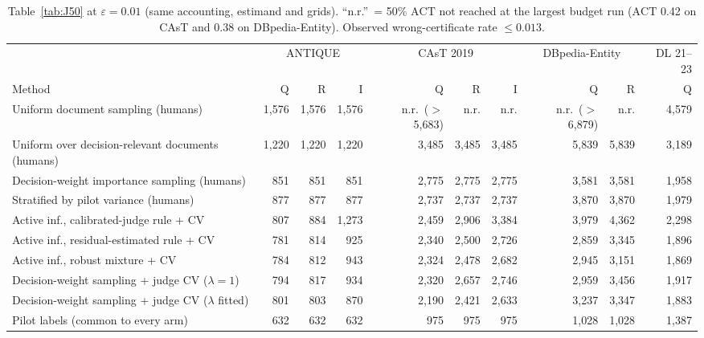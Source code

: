 \documentclass{article}
\newcommand{\eps}{\varepsilon}
\newcommand{\ACT}{\mathrm{ACT}}
\begin{document}
\begin{table}[htbp]\centering\scriptsize\setlength{\tabcolsep}{3pt}
\caption{Table~\ref{tab:J50} at $\eps=0.01$ (same accounting, estimand and grids). ``n.r.''\ = 50\% $\ACT$ not reached at the largest budget run ($\ACT$ 0.42 on CAsT and 0.38 on DBpedia-Entity). Observed wrong-certificate rate $\le0.013$.}\label{tab:J50b}
\begin{tabular}{l rrr rrr rr r}\toprule
 & \multicolumn{3}{c}{ANTIQUE} & \multicolumn{3}{c}{CAsT 2019} & \multicolumn{2}{c}{DBpedia-Entity} & DL 21--23\\
Method & Q & R & I & Q & R & I & Q & R & Q\\\midrule
Uniform document sampling (humans) & 1,576 & 1,576 & 1,576 & n.r.\ ($>$5,683) & n.r. & n.r. & n.r.\ ($>$6,879) & n.r. & 4,579\\
Uniform over decision-relevant documents (humans) & 1,220 & 1,220 & 1,220 & 3,485 & 3,485 & 3,485 & 5,839 & 5,839 & 3,189\\
Decision-weight importance sampling (humans) & 851 & 851 & 851 & 2,775 & 2,775 & 2,775 & 3,581 & 3,581 & 1,958\\
Stratified by pilot variance (humans) & 877 & 877 & 877 & 2,737 & 2,737 & 2,737 & 3,870 & 3,870 & 1,979\\
Active inf., calibrated-judge rule + CV & 807 & 884 & 1,273 & 2,459 & 2,906 & 3,384 & 3,979 & 4,362 & 2,298\\
Active inf., residual-estimated rule + CV & 781 & 814 & 925 & 2,340 & 2,500 & 2,726 & 2,859 & 3,345 & 1,896\\
Active inf., robust mixture + CV & 784 & 812 & 943 & 2,324 & 2,478 & 2,682 & 2,945 & 3,151 & 1,869\\
Decision-weight sampling + judge CV ($\lambda=1$) & 794 & 817 & 934 & 2,320 & 2,657 & 2,746 & 2,959 & 3,456 & 1,917\\
Decision-weight sampling + judge CV ($\lambda$ fitted) & 801 & 803 & 870 & 2,190 & 2,421 & 2,633 & 3,237 & 3,347 & 1,883\\\midrule
Pilot labels (common to every arm) & 632 & 632 & 632 & 975 & 975 & 975 & 1,028 & 1,028 & 1,387\\\bottomrule
\end{tabular}
\end{table}
\end{document}
